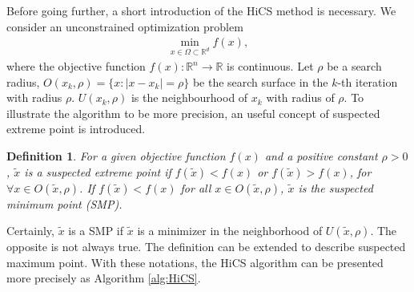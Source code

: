 \documentclass[final,1p,times]{elsarticle}
\newtheorem{definition}{Definition}
\newtheorem{proposition}{Proposition}
\def\bbR{\mathbb{R}}
\begin{document}
Before going further, a short introduction of the
HiCS method is necessary.
We consider an unconstrained optimization problem 
\begin{align}
	\min_{x\in\Omega\subset\mathbb{R}^d} f(x),
	\label{}
\end{align}
where the objective function $f(x):\bbR^n\rightarrow \bbR$ is
continuous. Let $\rho$ be a search radius, $O(x_k, \rho)=\{x:
|x-x_k|=\rho\}$ be the search surface in the
$k$-th iteration with radius $\rho$. $U(x_k,
\rho)$ is the neighbourhood of $x_k$ with radius of $\rho$.
To illustrate the algorithm to be more precision, an useful concept of
suspected extreme point is introduced.
\begin{definition}	
	For a given objective function $f(x)$ and a positive constant 
	$\rho>0$, $\tilde{x}$ is a suspected extreme point if $f(\tilde
	x)<f(x)$ or $f(\tilde x)>f(x)$, for $\forall x\in O(\tilde{x},\rho)$.
	If $f(\tilde x) < f(x)$ for all $x\in O(\tilde{x},\rho)$,
	$\tilde{x}$ is the suspected minimum point (SMP).
\end{definition}
Certainly, $\tilde{x}$ is a SMP if $\tilde{x}$ is a minimizer in
the neighborhood of $U(\tilde{x}, \rho)$. The opposite is not always true.
The definition can be extended to describe suspected maximum point.
With these notations, the HiCS algorithm can be presented
more precisely as Algorithm \ref{alg:HiCS}.
\end{document}
